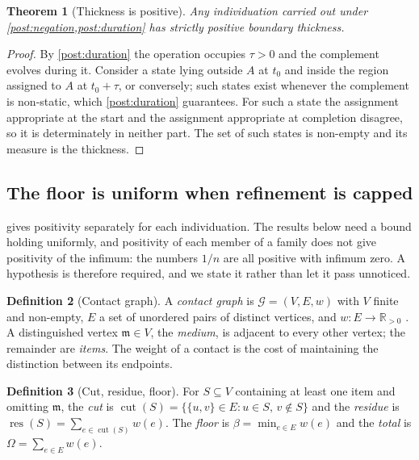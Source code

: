 \documentclass[11pt,twocolumn,a4paper]{article}
\theoremstyle{plain}
\newtheorem{theorem}{Theorem}[section]
\theoremstyle{definition}
\newtheorem{definition}[theorem]{Definition}
\theoremstyle{remark}
\newcommand{\Rpos}{\mathbb{R}_{>0}}
\newcommand{\Gph}{\mathcal{G}}
\newcommand{\med}{\mathfrak{m}}
\newcommand{\cut}{\operatorname{cut}}
\newcommand{\res}{\operatorname{res}}
\newcommand{\wt}{w}
\newcommand{\flo}{\beta}
\newcommand{\Tot}{\Omega}
\begin{document}
\begin{theorem}[Thickness is positive]
\label{thm:thickpos}
Any individuation carried out under
\cref{post:negation,post:duration} has strictly positive boundary thickness.
\end{theorem}

\begin{proof}
By \cref{post:duration} the operation occupies $\tau > 0$ and the complement
evolves during it. Consider a state lying outside $A$ at $t_0$ and inside the
region assigned to $A$ at $t_0+\tau$, or conversely; such states exist whenever
the complement is non-static, which \cref{post:duration} guarantees. For such a
state the assignment appropriate at the start and the assignment appropriate at
completion disagree, so it is determinately in neither part. The set of such
states is non-empty and its measure is the thickness.
\end{proof}

\subsection{The floor is uniform when refinement is capped}

 gives positivity separately for each individuation. The
results below need a bound holding uniformly, and positivity of each member of a
family does not give positivity of the infimum: the numbers $1/n$ are all
positive with infimum zero. A hypothesis is therefore required, and we state it
rather than let it pass unnoticed.

\begin{definition}[Contact graph]
\label{def:graph}
A \emph{contact graph} is $\Gph = (V, E, \wt)$ with $V$ finite and non-empty,
$E$ a set of unordered pairs of distinct vertices, and $\wt : E \to \Rpos$
\citep{diestel2010}. A distinguished vertex $\med \in V$, the \emph{medium}, is
adjacent to every other vertex; the remainder are \emph{items}. The weight of a
contact is the cost of maintaining the distinction between its endpoints.
\end{definition}

\begin{definition}[Cut, residue, floor]
\label{def:cut}
For $S \subseteq V$ containing at least one item and omitting $\med$, the
\emph{cut} is $\cut(S) = \{\{u,v\} \in E : u \in S,\, v \notin S\}$ and the
\emph{residue} is $\res(S) = \sum_{e \in \cut(S)} \wt(e)$. The \emph{floor} is
$\flo = \min_{e \in E} \wt(e)$ and the \emph{total} is
$\Tot = \sum_{e \in E} \wt(e)$.
\end{definition}
\end{document}
